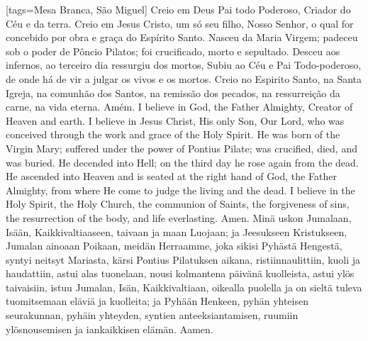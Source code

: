 {\begin{songs}{}
    [tags={Mesa Branca, São Miguel}]
      \beginverse
        Creio em Deus Pai todo Poderoso,
        Criador do Céu e da terra.
        \parspace
        Creio em Jesus Cristo, um só seu filho, Nosso
        Senhor, o qual for concebido por obra e graça do
        Espírito Santo. Nasceu da Maria Virgem;
        padeceu sob o poder de Pôncio Pilatos;
        foi crucificado, morto e sepultado. Desceu aos
        infernos, ao terceiro dia ressurgiu dos mortos,
        Subiu ao Céu e Pai Todo-poderoso, de onde há de vir
        a julgar os vivos e os mortos.
        \parspace
        Creio no Espirito Santo, na Santa Igreja,
        na comunhão dos Santos, na remissão
        dos pecados, na ressurreição da carne,
        na vida eterna.
        \parspace
        Amém.
      \endverse
      \beginverse
        I believe in God, the Father Almighty,
        Creator of Heaven and earth.
        \parspace
        I believe in Jesus Christ, His only Son, Our Lord,
        who was conceived through the work and grace of
        the Holy Spirit. He was born of the Virgin Mary;
        suffered under the power of Pontius Pilate;
        was crucified, died, and was buried. He decended
        into Hell; on the third day he rose again from
        the dead. He ascended into Heaven and is seated
        at the right hand of God, the Father Almighty, from
        where He come to judge the living and the dead.
        \parspace
        I believe in the Holy Spirit, the Holy Church,
        the communion of Saints, the forgiveness of sins,
        the resurrection of the body, and life everlasting.
        \parspace
        Amen.
      \endverse
      \beginverse
        Minä uskon Jumalaan, Isään, Kaikkivaltiaaseen,
        taivaan ja maan Luojaan;
        \parspace
        ja Jeesukseen Kristukseen, Jumalan ainoaan Poikaan,
        meidän Herraamme, joka sikisi Pyhästä Hengestä,
        syntyi neitsyt Mariasta, kärsi Pontius Pilatuksen
        aikana, ristiinnaulittiin, kuoli ja haudattiin,
        astui alas tuonelaan, nousi kolmantena päivänä
        kuolleista, astui ylös taivaisiin, istuu Jumalan,
        Isän, Kaikkivaltiaan, oikealla puolella ja on sieltä
        tuleva tuomitsemaan eläviä ja kuolleita;
        \parspace
        ja Pyhään Henkeen, pyhän yhteisen seurakunnan,
        pyhäin yhteyden, syntien anteeksiantamisen,
        ruumiin ylösnousemisen ja iankaikkisen elämän.
        \parspace
        Aamen.
      \endverse
    \endsong



\end{songs}}
